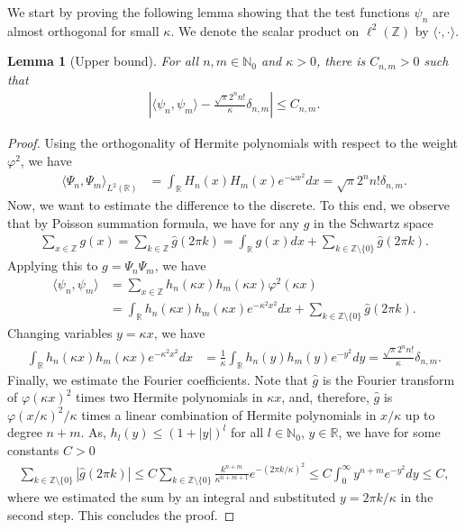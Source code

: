 \documentclass[12pt, reqno]{amsart}
\newtheorem{lemma}[theorem]{Lemma}
\theoremstyle{definition}
\numberwithin{equation}{section}
\newcommand{\Z}{{\mathbb Z}}
\newcommand{\R}{{\mathbb R}}
\begin{document}
We start by proving the following lemma showing that the test functions $\psi_n$ are almost orthogonal for small $\kappa$. We denote the scalar product on $\ell^2(\Z)$ by $\langle \cdot,\cdot\rangle$.

\begin{lemma}[Upper bound]\label{lem:almost_orthogonality}
 For all $n,m\in \mathbb{N}_0$ and $\kappa>0$, there is $C_{n,m}>0$ such that
\begin{align*}
    \left|\langle \psi_{n },\psi_{m }\rangle- \frac{ \sqrt{\pi}2^nn!}{\kappa }\delta_{n,m} \right| \leq C_{n,m} .
\end{align*}
\end{lemma}
\begin{proof}
 Using the orthogonality of Hermite polynomials with respect to the weight $\varphi^2$, we have
\begin{align*}
    \langle \Psi_{n },\Psi_{m }\rangle_{L^2(\R)} &= \int_{\R} H_n(x)H_m(x)e^{-\omega x^2} dx = \sqrt{\pi}2^nn!\delta_{n,m}.
\end{align*}
Now, we want to estimate the difference to the discrete. To this end, we observe that by Poisson summation formula, we have for any $g$ in the Schwartz space %
\begin{align*}
    \sum_{x\in \Z} g(x)=\sum_{k\in \Z} \hat{g}(2\pi k)  = \int_{\R} g(x) dx + \sum_{k\in \Z\setminus\{0\}} \hat{g}(2\pi k). 
\end{align*}
Applying this to $g =\Psi_n \Psi_m $, we have
\begin{align*}
    \langle \psi_{n },\psi_{m }\rangle &=  \sum_{x\in \Z} h_{n}(\kappa  x)h_{m}(\kappa  x) \varphi^2(\kappa x)   \\
    &= \int_{\R} h_n(\kappa x)h_m(\kappa x) e^{-\kappa^2 x^2} dx + \sum_{k\in \Z\setminus\{0\}} \hat{g}(2\pi k) .
\end{align*}
Changing variables $y=\kappa  x$, we have 
\begin{align*}
    \int_{\R} h_n(\kappa x)h_m(\kappa x) e^{-\kappa^2 x^2} dx &= \frac{1}{\kappa} \int_{\R} h_n(y)h_m(y) e^{-y^2} dy = \frac{\sqrt{\pi}2^nn!}{\kappa}\delta_{n,m}.
\end{align*}   
 Finally, we estimate the Fourier coefficients. Note that $\hat{g}$ is the Fourier transform of $\varphi (\kappa x)^2 $ times two Hermite polynomials in $\kappa x$,  and, therefore, $\hat{g}$ is  $\varphi (x/\kappa)^2 /\kappa$ times a linear combination of Hermite polynomials in $x/\kappa$ up to degree $n+m$.
As, $h_l( y) \leq (1+|y|)^l$ for all $l\in \mathbb{N}_0$, $y\in \R$, we have for some constants $C >0$
\begin{align*}
    \sum_{k\in \Z\setminus\{0\}} |\hat{g}(2\pi k)|
\le C\sum_{k\in \Z\setminus\{0\}}  \frac{ k^{n+m}}{\kappa^{n+m+1}}
e^{- ({2\pi k}/{\kappa})^2}
\le  C \int_0^\infty y^{n+m} e^{- y^2} dy\leq C,
\end{align*}
where we estimated the sum by an integral and substituted $y=2\pi k/\kappa$ in the second step. This concludes the proof.
\end{proof}
\end{document}
